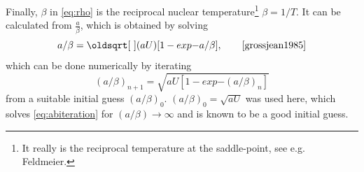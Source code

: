 Finally, $\beta$ in \eqref{eq:rho} is the reciprocal nuclear temperature\footnote{It really is the reciprocal temperature at the saddle-point, see e.g. Feldmeier\cite{grossjean1985}.} $\beta=1/T$. It can be calculated from $\tfrac{a}{\beta}$, which is obtained by solving
\begin{equation}
a/\beta=\sqrt{(aU)[1 -exp{-a/\beta}]},\qquad\cite{grossjean1985}\label{eq:abiteration}
\end{equation}
which can be done numerically by iterating
\begin{equation}
(a/\beta)_{n+1}=\sqrt{aU[1 -exp{-(a/\beta)_n}]}
\end{equation}
from a suitable initial guess $(a/\beta)_{0}$. $(a/\beta)_{0}=\sqrt{aU}$ was used here, which solves \eqref{eq:abiteration} for $(a/\beta) \to \infty$ and is known to be a good initial guess\cite{grossjean1985}.

\def\bredd{0.5}

